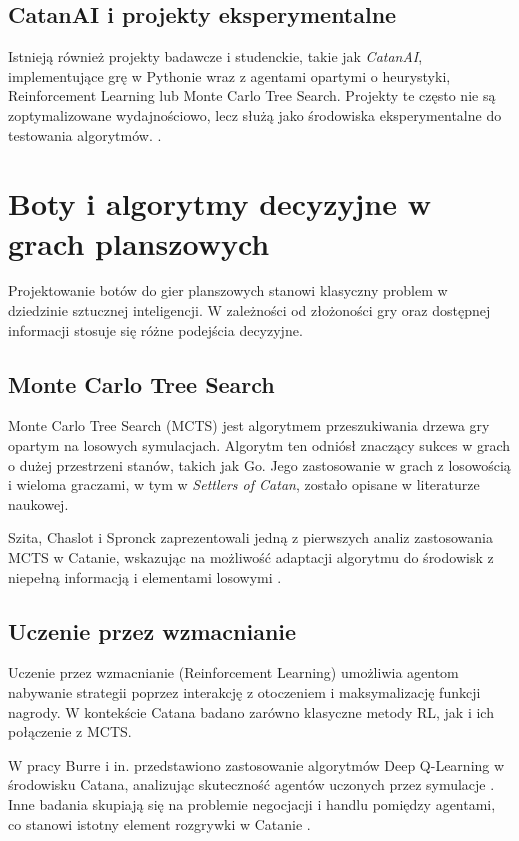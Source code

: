 \documentclass[polish,inz,longabstract]{iithesis}
\begin{document}
\subsection{CatanAI i projekty eksperymentalne}

Istnieją również projekty badawcze i studenckie, takie jak \textit{CatanAI}, implementujące grę w Pythonie wraz z agentami opartymi o heurystyki, Reinforcement Learning lub Monte Carlo Tree Search. Projekty te często nie są zoptymalizowane wydajnościowo, lecz służą jako środowiska eksperymentalne do testowania algorytmów. \cite{3}.

\section{Boty i algorytmy decyzyjne w grach planszowych}

Projektowanie botów do gier planszowych stanowi klasyczny problem w dziedzinie sztucznej inteligencji. W zależności od złożoności gry oraz dostępnej informacji stosuje się różne podejścia decyzyjne.

\subsection{Monte Carlo Tree Search}
Monte Carlo Tree Search (MCTS) jest algorytmem przeszukiwania drzewa gry opartym na losowych symulacjach. Algorytm ten odniósł znaczący sukces w grach o dużej przestrzeni stanów, takich jak Go. Jego zastosowanie w grach z losowością i wieloma graczami, w tym w \textit{Settlers of Catan}, zostało opisane w literaturze naukowej.

Szita, Chaslot i Spronck zaprezentowali jedną z pierwszych analiz zastosowania MCTS w Catanie, wskazując na możliwość adaptacji algorytmu do środowisk z niepełną informacją i elementami losowymi \cite{4}.

\subsection{Uczenie przez wzmacnianie}

Uczenie przez wzmacnianie (Reinforcement Learning) umożliwia agentom nabywanie strategii poprzez interakcję z otoczeniem i maksymalizację funkcji nagrody. W kontekście Catana badano zarówno klasyczne metody RL, jak i ich połączenie z MCTS.

W pracy Burre i in. przedstawiono zastosowanie algorytmów Deep Q-Learning w środowisku Catana, analizując skuteczność agentów uczonych przez symulacje \cite{5}. Inne badania skupiają się na problemie negocjacji i handlu pomiędzy agentami, co stanowi istotny element rozgrywki w Catanie \cite{6}.
\end{document}
